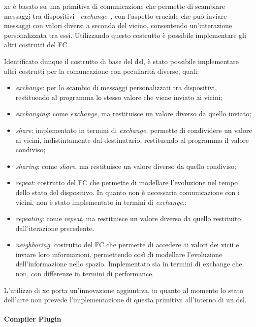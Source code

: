 \documentclass[13pt, a4paper]{scrartcl}
\begin{document}
\ac{xc} è basato su una primitiva di comunicazione che permette di scambiare messaggi tra dispositivi --\emph{exchange}--,
    con l'aspetto cruciale che può inviare messaggi con valori diversi a seconda del vicino, consentendo un'interazione
    personalizzata tra essi.
%
Utilizzando questo costrutto è possibile implementare gli altri costrutti del \ac{FC}.

Identificato dunque il costrutto di base del \ac{dsl}, è stato possibile implementare altri costrutti per la comuncazione
    con peculiarità diverse, quali:
\begin{itemize}
    \item \emph{exchange}: per lo scambio di messaggi personalizzati tra dispositivi, restituendo al programma lo stesso
        valore che viene inviato ai vicini;
    \item \emph{exchanging}: come \emph{exchange}, ma restituisce un valore diverso da quello inviato;
    \item \emph{share}: implementato in termini di \emph{exchange}, permette di condividere un valore ai vicini, indistintamente
        dal destinatario, restituendo al programma il valore condiviso;
    \item \emph{sharing}: come \emph{share}, ma restituisce un valore diverso da quello condiviso;
    \item \emph{repeat}: costrutto del \ac{FC} che permette di modellare l'evoluzione nel tempo dello stato del dispositivo.
        In quanto non è necessaria comunicazione con i vicini, non è stato implementato in termini di \emph{exchange}.;
    \item \emph{repeating}: come \emph{repeat}, ma restituisce un valore diverso da quello restituito dall'iterazione precedente.
    \item \emph{neighboring}: costrutto del \ac{FC} che permette di accedere ai valori dei vicii e inviare loro informazioni,
        permettendo così di modellare l'evoluzione dell'informazione nello spazio.
        Implementato sia in termini di exchange che non, con differenze in termini di performance.
\end{itemize}

L'utilizzo di \ac{xc} porta un'innovazione aggiuntiva, in quanto al momento lo stato dell'arte non prevede l'implementazione di
    questa primitiva all'interno di un \ac{dsl}.


\paragraph{Compiler Plugin}
\end{document}
